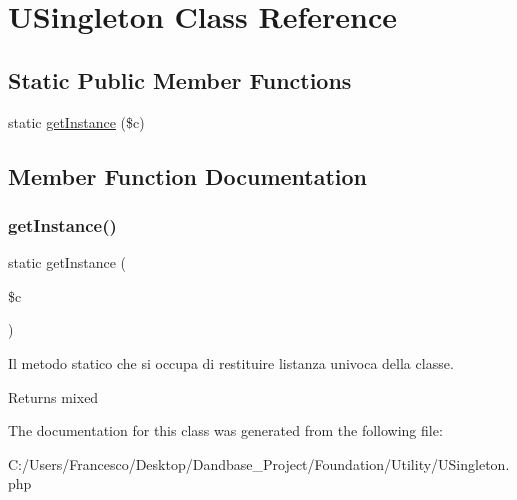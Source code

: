 \hypertarget{class_u_singleton}{}\section{U\+Singleton Class Reference}
\label{class_u_singleton}
\subsection*{Static Public Member Functions}
\begin{DoxyCompactItemize}
\item 
static \mbox{\hyperlink{class_u_singleton_a280a34147beea137ea38ae3168560f11}{get\+Instance}} (\$c)
\end{DoxyCompactItemize}


\subsection{Member Function Documentation}
\mbox{\label{class_u_singleton_a280a34147beea137ea38ae3168560f11}} 
\subsubsection{\texorpdfstring{get\+Instance()}{getInstance()}}
{\footnotesize\ttfamily static get\+Instance (\begin{DoxyParamCaption}\item[{}]{\$c }\end{DoxyParamCaption})\hspace{0.3cm}{\ttfamily [static]}}

Il metodo statico che si occupa di restituire l\textquotesingle{}istanza univoca della classe.

\begin{DoxyReturn}{Returns}
mixed 
\end{DoxyReturn}


The documentation for this class was generated from the following file\+:\begin{DoxyCompactItemize}
\item 
C\+:/\+Users/\+Francesco/\+Desktop/\+Dandbase\+\_\+\+Project/\+Foundation/\+Utility/U\+Singleton.\+php\end{DoxyCompactItemize}
